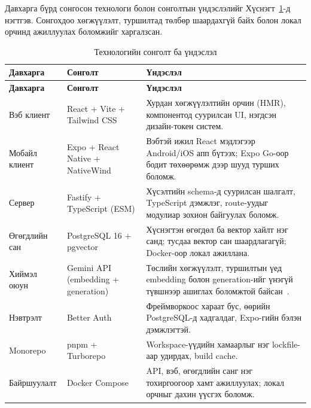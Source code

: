 \documentclass[../main.tex]{subfiles}
\begin{document}
Давхарга бүрд сонгосон технологи болон сонголтын үндэслэлийг
Хүснэгт~\ref{tab:techstack}-д нэгтгэв. Сонгохдоо хөгжүүлэлт, туршилтад
төлбөр шаардахгүй байх болон локал орчинд ажиллуулах боломжийг харгалзсан.

\renewcommand{\arraystretch}{1.3}
\begin{longtable}{|>{\raggedright\arraybackslash}m{2.6cm}
                  |>{\raggedright\arraybackslash}m{4.2cm}
                  |>{\raggedright\arraybackslash}m{\dimexpr\linewidth-6.8cm-6\tabcolsep-4\arrayrulewidth\relax}|}
\caption{Технологийн сонголт ба үндэслэл}
\label{tab:techstack}
\\ \hline
\textbf{Давхарга} & \textbf{Сонголт} & \textbf{Үндэслэл} \\ \hline
\endfirsthead
\hline
\textbf{Давхарга} & \textbf{Сонголт} & \textbf{Үндэслэл} \\ \hline
\endhead

Вэб клиент &
React + Vite + Tailwind CSS &
Хурдан хөгжүүлэлтийн орчин (HMR), компонентод суурилсан UI, нэгдсэн
дизайн-токен систем. \\ \hline

Мобайл клиент &
Expo + React Native + NativeWind &
Вэбтэй ижил React мэдлэгээр Android/iOS апп бүтээх; Expo Go-оор бодит
төхөөрөмж дээр шууд турших боломж. \\ \hline

Сервер &
Fastify + TypeScript (ESM) &
Хүсэлтийн schema-д суурилсан шалгалт, TypeScript дэмжлэг,
route-уудыг модулиар зохион байгуулах боломж. \\ \hline

Өгөгдлийн сан &
PostgreSQL 16 + pgvector &
Хүснэгтэн өгөгдөл ба вектор хайлт нэг санд; тусдаа вектор сан шаардлагагүй;
Docker-оор локал ажиллана. \\ \hline

Хиймэл оюун &
Gemini API (embedding + generation) &
Төслийн хөгжүүлэлт, туршилтын үед embedding болон generation-ийг
үнэгүй түвшнээр ашиглах боломжтой байсан~\cite{geminiapi}. \\ \hline

Нэвтрэлт &
Better Auth &
Фреймворкоос хараат бус, өөрийн PostgreSQL-д хадгалдаг, Expo-гийн бэлэн
дэмжлэгтэй. \\ \hline

Monorepo &
pnpm + Turborepo &
Workspace-үүдийн хамаарлыг нэг lockfile-аар удирдах, build cache. \\ \hline

Байршуулалт &
Docker Compose &
API, вэб, өгөгдлийн санг нэг тохиргоогоор хамт ажиллуулах;
локал орчныг дахин үүсгэх боломж. \\ \hline
\end{longtable}
\end{document}
